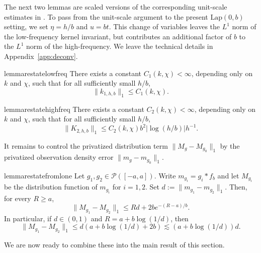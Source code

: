 \documentclass[english, 11pt]{article}
\theoremstyle{plain}
\theoremstyle{definition}
\theoremstyle{remark}
\begin{document}
The next two lemmas are scaled versions of the corresponding unit-scale estimates in \cite[Appendix~S1]{rousseau2024wasserstein}. To pass from the unit-scale argument to the present $\mathrm{Lap}(0,b)$ setting, we set $\eta=h/b$ and $u=bt$. This change of variables leaves the $L^1$ norm of the low-frequency kernel invariant, but contributes an additional factor of $b$ to the $L^1$ norm of the high-frequency. 
We leave the technical details in Appendix~\ref{app:deconv}.

\begin{restatable}{lemma}{restatelowfreq}\label{lem:K1-bound}
There exists a constant $C_1(k,\chi)<\infty$, depending only on $k$ and $\chi$, such that for all sufficiently small $h/b$,
\begin{equation}\label{eq:K1-bound}
\|k_{1,h,b}\|_1\le C_1(k,\chi).
\end{equation}
\end{restatable}

\begin{restatable}{lemma}{restatehighfreq}\label{lem:F2-bound}
There exists a constant $C_2(k,\chi)<\infty$, depending only on $k$ and $\chi$, such that for all sufficiently small $h/b$, 
\begin{equation}\label{eq:F2-bound}
\|K_{2,h,b}\|_1 \le C_2(k,\chi) b^2 |\log(h/b)| h^{-1}.
\end{equation}
\end{restatable}

It remains to control the privatized distribution term $\|M_g-M_{g_0}\|_1$ by the privatized observation density error $\|m_g-m_{g_0}\|_1$.

\begin{restatable}{lemma}{restatefromlone}\label{lem:L1-to-W1-released}
Let $g_1,g_2\in\mathcal P([-a,a])$. Write $m_{g_i}=g_i*f_b$ and let $M_{g_i}$ be the distribution function of $m_{g_i}$ for $i=1,2$. Set
$d:=\|m_{g_1}-m_{g_2}\|_{1}$.
Then, for every $R\ge a$,
\begin{equation}\label{eq:W1-trunc}
\|M_{g_1}-M_{g_2}\|_1 \le Rd + 2b e^{-(R-a)/b}.
\end{equation}
In particular, if $d\in(0,1)$ and
$R=a+b\log(1/d)$,
then
\begin{equation}\label{eq:L1-to-W1-released-final}
\|M_{g_1}-M_{g_2}\|_1 \le d\left(a+b\log(1/d)+2b\right)
\lesssim \left(a+b\log(1/d)\right)d.
\end{equation}
\end{restatable}
We are now ready to combine these into the main result of this section.
\end{document}
